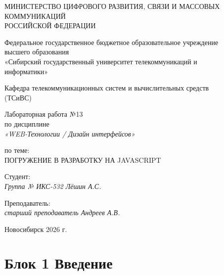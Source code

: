 \documentclass[a4paper,14pt,oneside,openany]{memoir}
\begin{document}
\thispagestyle{empty}

\begin{center}
    МИНИСТЕРСТВО ЦИФРОВОГО РАЗВИТИЯ, СВЯЗИ И МАССОВЫХ \\ КОММУНИКАЦИЙ \\ РОССИЙСКОЙ ФЕДЕРАЦИИ

    \vspace{20pt}

    Федеральное государственное бюджетное образовательное учреждение \\ высшего образования \\
    «Сибирский государственный университет телекоммуникаций и \\ информатики»

    \vspace{20pt}

    Кафедра телекоммуникационных систем и вычислительных средств \\ (ТСиВС)
\end{center}

\vfill

\begin{center}
    Лабораторная работа №13 \\
    по дисциплине \\
    \textit{«WEB-Технологии / Дизайн интерфейсов»}

    \vspace{20pt}

    по теме: \\
    \uppercase{Погружение в разработку на JavaScript}
\end{center}

\vfill

\noindent Студент: \\
\textit{Группа № ИКС-532 \hfill Лёшин А.С.}

\vspace{20pt}

\noindent Преподаватель: \\
\textit{старший преподаватель \hfill Андреев А.В.}

\vfill

\begin{center}
    Новосибирск 2026 г.
\end{center}

\newpage
\setcounter{page}{2}
\OnehalfSpacing*

\section{Блок 1 Введение}
\end{document}
